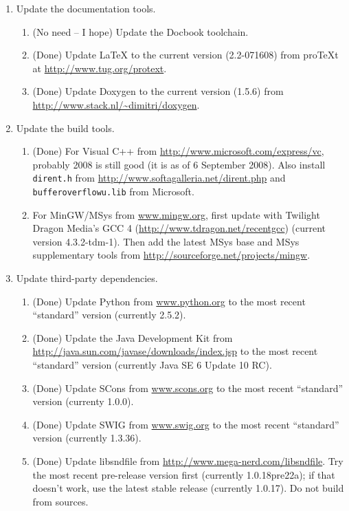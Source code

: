 \documentclass[11pt,letterpaper,onecolumn]{scrartcl}
\begin{document}
\begin{sloppypar}
\begin{enumerate}
	\item Update the documentation tools.
		\begin{enumerate}
	    \item (No need -- I hope) Update the Docbook toolchain.
	    \item (Done) Update LaTeX to the current version (2.2-071608) from proTeXt at \url{http://www.tug.org/protext}.
	    \item (Done) Update Doxygen to the current version (1.5.6) from \url{http://www.stack.nl/~dimitri/doxygen}.
		\end{enumerate}
	\item Update the build tools.   
		\begin{enumerate}
			\item (Done) For Visual C++ from \url{http://www.microsoft.com/express/vc}, probably 2008 is still good (it is as of 6 September 2008). Also install \texttt{dirent.h} from \url{http://www.softagalleria.net/dirent.php} and \texttt{bufferoverflowu.lib}  from Microsoft.
			\item For MinGW/MSys from \url{www.mingw.org}, first update with Twilight Dragon Media's GCC 4 (\url{http://www.tdragon.net/recentgcc}) (current version 4.3.2-tdm-1). Then add the latest MSys base and MSys supplementary tools from \url{http://sourceforge.net/projects/mingw}.
		\end{enumerate}    
	\item Update third-party dependencies.   
		\begin{enumerate}
  		\item (Done) Update Python from \url{www.python.org} to the most recent ``standard'' version (currently 2.5.2).
	    \item (Done) Update the Java Development Kit from \url{http://java.sun.com/javase/downloads/index.jsp} to the most recent ``standard'' version (currently Java SE 6 Update 10 RC).
	    \item (Done) Update SCons from \url{www.scons.org} to the most recent ``standard'' version (currenty 1.0.0).
	    \item (Done) Update SWIG from \url{www.swig.org} to the most recent ``standard'' version (currently 1.3.36).
			\item (Done) Update libsndfile from \url{http://www.mega-nerd.com/libsndfile}. Try the most recent pre-release version first (currently 1.0.18pre22a); if that doesn't work, use the latest stable release (currently 1.0.17). Do not build from sources. 

\end{enumerate}
\end{enumerate}
\end{sloppypar}
\end{document}
